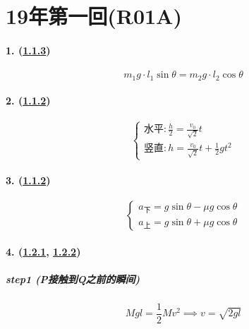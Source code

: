 
\section{19年第一回(R01A)}

\paragraph{1. (\hyperref[subsec:1.1.3]{1.1.3})}

\begin{equation*}
    m_1g\cdot l_1\sin\theta=m_2g\cdot l_2\cos\theta
\end{equation*}

\paragraph{2. (\hyperref[subsec:1.1.2]{1.1.2})}

\begin{equation*}
    \begin{cases}
        \textrm{水平}:\frac{h}{2}=\frac{v_0}{\sqrt{2}}t\\
        \textrm{竖直}:h=\frac{v_0}{\sqrt{2}}t+\frac12gt^2
    \end{cases}
\end{equation*}

\paragraph{3. (\hyperref[subsec:1.1.2]{1.1.2})}

\begin{equation*}
    \begin{cases}
        a_\textrm{下}=g\sin\theta-\mu g\cos\theta\\
        a_\textrm{上}=g\sin\theta+\mu g\cos\theta
    \end{cases}
\end{equation*}

\paragraph{4. (\hyperref[subsec:1.2.1]{1.2.1}, \hyperref[subsec:1.2.2]{1.2.2})}

\subparagraph{step1 (P接触到Q之前的瞬间)}

\begin{equation*}
    Mgl=\frac12Mv^2\implies
    v=\sqrt{2gl}
\end{equation*}


